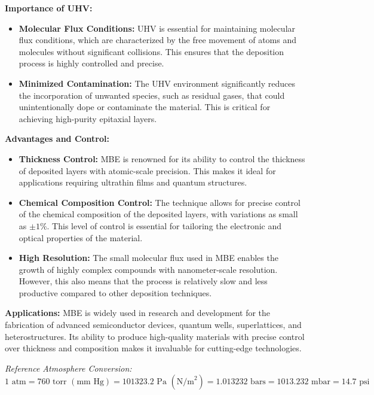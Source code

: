 \documentclass{report}
\begin{document}
\textbf{Importance of UHV:}
\begin{itemize}
    \item \textbf{Molecular Flux Conditions:} UHV is essential for maintaining molecular flux conditions, which are characterized by the free movement of atoms and molecules without significant collisions. This ensures that the deposition process is highly controlled and precise.
    \item \textbf{Minimized Contamination:} The UHV environment significantly reduces the incorporation of unwanted species, such as residual gases, that could unintentionally dope or contaminate the material. This is critical for achieving high-purity epitaxial layers.
\end{itemize}

\textbf{Advantages and Control:}
\begin{itemize}
    \item \textbf{Thickness Control:} MBE is renowned for its ability to control the thickness of deposited layers with atomic-scale precision. This makes it ideal for applications requiring ultrathin films and quantum structures.
    \item \textbf{Chemical Composition Control:} The technique allows for precise control of the chemical composition of the deposited layers, with variations as small as $\pm 1\%$. This level of control is essential for tailoring the electronic and optical properties of the material.
    \item \textbf{High Resolution:} The small molecular flux used in MBE enables the growth of highly complex compounds with nanometer-scale resolution. However, this also means that the process is relatively slow and less productive compared to other deposition techniques.
\end{itemize}

\textbf{Applications:} MBE is widely used in research and development for the fabrication of advanced semiconductor devices, quantum wells, superlattices, and heterostructures. Its ability to produce high-quality materials with precise control over thickness and composition makes it invaluable for cutting-edge technologies.

\vspace{0.5cm}
\noindent \textit{Reference Atmosphere Conversion:}
$1 \text{ atm} = 760 \text{ torr } (\text{mm Hg}) = 101323.2 \text{ Pa } (\text{N/m}^2) = 1.013232 \text{ bars} = 1013.232 \text{ mbar} = 14.7 \text{ psi}$
\end{document}
